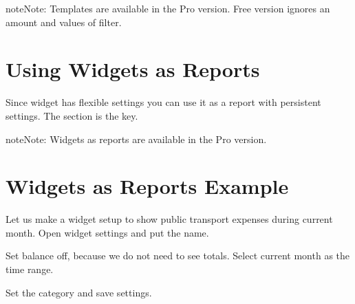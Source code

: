 \documentclass[a4paper,10pt,english]{sphinxmanual}
\begin{document}
\begin{sphinxadmonition}{note}{Note:}
Templates are available in the Pro version. Free version ignores an amount and values of filter.
\end{sphinxadmonition}


\section{Using Widgets as Reports}
\label{\detokenize{widgets:using-widgets-as-reports}}
Since widget has flexible settings you can use it as a report with persistent settings. The
 section is the key.

\begin{sphinxadmonition}{note}{Note:}
Widgets as reports are available in the Pro version.
\end{sphinxadmonition}


\section{Widgets as Reports Example}
\label{\detokenize{widgets:widgets-as-reports-example}}
Let us make a widget setup to show public transport expenses during current month.
Open widget settings and put the  name.

\noindent{}

\noindent{}

\noindent{}

Set balance off, because we do not need to see totals. Select current month as the time range.

\noindent{}

\noindent{}

\noindent{}

Set the  category and save settings.

\noindent{}
\end{document}
